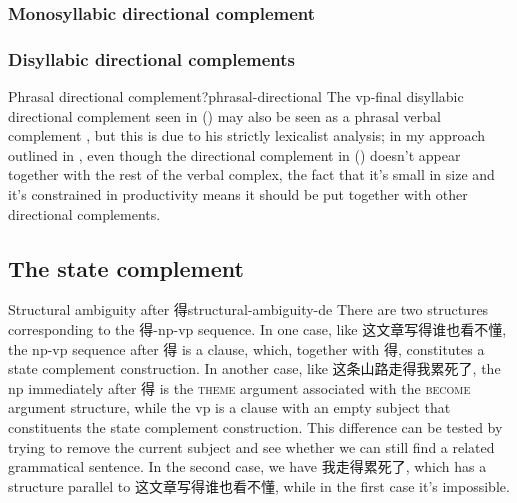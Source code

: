 \documentclass[UTF8, a4paper, oneside, scheme=plain, 12pt]{ctexrep}
\newcommand*{\citepage}[1]{p.~{#1}}
\newcommand*{\category}[1]{\textsc{#1}}
\begin{document}
\subsubsection{Monosyllabic directional complement}



\subsubsection{Disyllabic directional complements}

\begin{infobox}{Phrasal directional complement?}{phrasal-directional}
    The \acs{vp}-final disyllabic directional complement seen in 
    ()
    may also be seen as a phrasal verbal complement 
    \citep[\citepage{120}]{deng2010formal}, 
    but this is due to his strictly lexicalist analysis; 
    in my approach outlined in , 
    even though the directional complement in  
    ()
    doesn't appear together with the rest of the verbal complex, 
    the fact that it's small in size and  
    it's constrained in productivity
    means it should be put together with other directional complements. 
\end{infobox}

\subsection{The state complement}



\begin{infobox}{Structural ambiguity after 得}{structural-ambiguity-de}
    There are two structures corresponding to the 得-\acs{np}-\acs{vp} sequence.
    In one case, like 这文章写得谁也看不懂, the \acs{np}-\acs{vp} sequence after 得 is a clause, 
    which, together with 得, constitutes 
    a state complement construction.
    In another case, like 这条山路走得我累死了, 
    the \acs{np} immediately after 得 
    is the \category{theme} argument associated with the \category{become} argument structure, 
    while the \acs{vp} is a clause with an empty subject 
    that constituents the state complement construction.
    This difference can be tested by trying to remove the current subject 
    and see whether we can still find a related grammatical sentence. 
    In the second case, we have 我走得累死了, 
    which has a structure parallel to 这文章写得谁也看不懂, 
    while in the first case it's impossible. 
\end{infobox}
\end{document}
